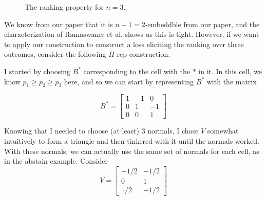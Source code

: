 \documentclass[12pt]{article}
\begin{document}
\begin{figure}
\begin{center}
\caption{The ranking property for $n=3$.}
\label{fig:ranking-simplex}
\end{center}
\end{figure}

We know from our paper that it is $n-1=2$-embeddble from our paper, and the characterization of Ramaswamy et al. shows us this is tight.
However, if we want to apply our construction to construct a loss eliciting the ranking over three outcomes, consider the following $H$-rep construction.


I started by choosing $B^*$ corresponding to the cell with the $*$ in it.
In this cell, we know $p_1 \geq p_2 \geq p_3$ here, and so we can start by representing $B^*$ with the matrix

\[
B^* = \begin{bmatrix*}
1 & -1 & 0 \\
0 & 1 & -1 \\
0 & 0 & 1
\end{bmatrix*}
\]


Knowing that I needed to choose (at least) 3 normals, I chose $V$ somewhat intuitively to form a triangle and then tinkered with it until the normals worked.
With these normals, we can actually use the same set of normals for each cell, as in the abstain example.
Consider 
\[
V = \begin{bmatrix*}
-1/2 & -1/2 \\
0 & 1  \\
1/2 & -1/2 
\end{bmatrix*}
\]
\end{document}
